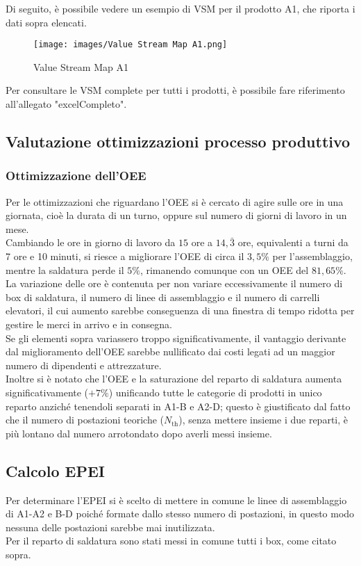 \documentclass[11pt]{article}
\begin{document}
\noindent
Di seguito, è possibile vedere un esempio di VSM per il prodotto A1, che riporta i dati sopra elencati.
\begin{figure}[H]
    \centering
    \texttt{[image: images/Value Stream Map A1.png]}
    \caption{Value Stream Map A1}
    \label{fig: Value Stream Map A1}
\end{figure}

\noindent
Per consultare le VSM complete per tutti i prodotti, è possibile fare riferimento all'allegato "{{excelCompleto}}".
\newpage

\subsection{Valutazione ottimizzazioni processo produttivo}
\subsubsection{Ottimizzazione dell'OEE}
Per le ottimizzazioni che riguardano l'OEE si è cercato di agire sulle ore in una giornata, cioè la durata di un turno, oppure sul numero di giorni di lavoro in un mese.\\
Cambiando le ore in giorno di lavoro da \(15\) ore a \(14,\bar{3}\) ore, equivalenti a turni da 7 ore e 10 minuti, si riesce a migliorare l'OEE di circa il \(3,5\%\) per l'assemblaggio, mentre la saldatura perde il \(5\%\), rimanendo comunque con un OEE del \(81,65\%\).\\
La variazione delle ore è contenuta per non variare eccessivamente il numero di box di saldatura, il numero di linee di assemblaggio e il numero di carrelli elevatori, il cui aumento sarebbe conseguenza di una finestra di tempo ridotta per gestire le merci in arrivo e in consegna.\\
Se gli elementi sopra variassero troppo significativamente, il vantaggio derivante dal miglioramento dell'OEE sarebbe nullificato dai costi legati ad un maggior numero di dipendenti e attrezzature.\\
Inoltre si è notato che l'OEE e la saturazione del reparto di saldatura aumenta significativamente (\(+7\%\)) unificando tutte le categorie di prodotti in unico reparto anziché tenendoli separati in A1-B e A2-D; questo è giustificato dal fatto che il numero di postazioni teoriche (\(N_{\text{th}}\)), senza mettere insieme i due reparti, è più lontano dal numero arrotondato dopo averli messi insieme.
\newpage

\subsection{Calcolo EPEI}
Per determinare l'EPEI si è scelto di mettere in comune le linee di assemblaggio di A1-A2 e B-D poiché formate dallo stesso numero di postazioni, in questo modo nessuna delle postazioni sarebbe mai inutilizzata.\\
Per il reparto di saldatura sono stati messi in comune tutti i box, come citato sopra.\\
\end{document}
